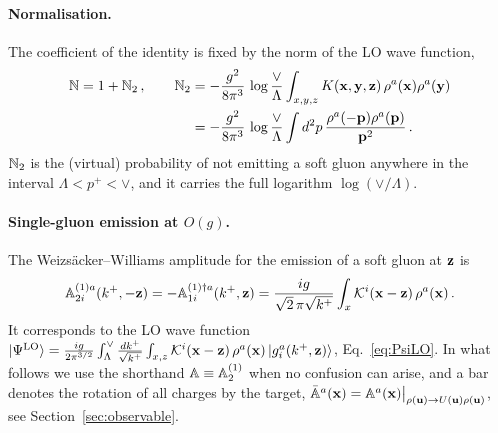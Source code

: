 \paragraph{Normalisation.} The coefficient of the identity is fixed by the norm of the LO wave function,
\begin{align}\label{eq:N2}
\mathbb{N}=1+\mathbb{N}_2\,,\qquad
\mathbb{N}_2&=-\frac{g^2}{8\pi^3}\,\log\frac{\vee}{\Lambda}\int_{x,y,z}K(\mathbf{x},\mathbf{y},\mathbf{z})\,\rho^a(\mathbf{x})\rho^a(\mathbf{y})
\notag\\&=-\frac{g^2}{8\pi^3}\,\log\frac{\vee}{\Lambda}\int d^2p\,\frac{\rho^a(-\mathbf{p})\rho^a(\mathbf{p})}{\mathbf{p}^2}\,.
\end{align}
$\mathbb{N}_2$ is the (virtual) probability of not emitting a soft gluon anywhere in the interval $\Lambda<p^+<\vee$, and it carries the full logarithm $\log(\vee/\Lambda)$.

\paragraph{Single-gluon emission at $O(g)$.} The Weizs\"acker--Williams amplitude for the emission of a soft gluon at $\mathbf{z}$ is
\begin{align}\label{eq:A1}
\mathbb{A}^{(1)a}_{2i}(k^+,-\mathbf{z})=-\mathbb{A}^{(1)\dagger a}_{1i}(k^+,\mathbf{z})=\frac{ig}{\sqrt2\,\pi\sqrt{k^+}}\int_x\mathcal{K}^i(\mathbf{x}-\mathbf{z})\,\rho^a(\mathbf{x})\,.
\end{align}
It corresponds to the LO wave function $\ket{\Psi^{\rm LO}}=\frac{ig}{2\pi^{3/2}}\int_\Lambda^\vee\frac{dk^+}{\sqrt{k^+}}\int_{x,z}\mathcal{K}^i(\mathbf{x}-\mathbf{z})\,\rho^a(\mathbf{x})\ket{g^a_i(k^+,\mathbf{z})}$, Eq.~\eqref{eq:PsiLO}. In what follows we use the shorthand $\mathbb{A}\equiv\mathbb{A}^{(1)}_2$ when no confusion can arise, and a bar denotes the rotation of all charges by the target, $\bar{\mathbb{A}}^a(\mathbf{x})=\mathbb{A}^a(\mathbf{x})\big|_{\rho(\mathbf{u})\to U(\mathbf{u})\rho(\mathbf{u})}$, see Section~\ref{sec:observable}.

